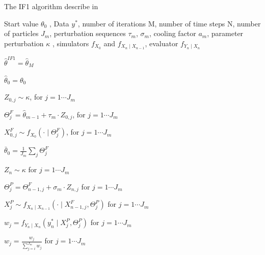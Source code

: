 \documentclass[twoside,openright]{report}
\begin{document}
\begin{algorithm}
  \caption{The IF1 algorithm describe in \cite{ionides2011iterated}}\label{alg:IF1_pseudo_code}
  \begin{algorithmic}
    
    \Require Start value $\theta_0$ , Data $y^{*}$, number of iterations M, number of time steps N,  number of particles $J_m$, perturbation sequences $\tau_m$, $\sigma_m$, cooling factor $a_m$, parameter perturbation $\kappa$ , simulators $f_{X_0}$ and $f_{X_n \mid X_{n-1}}$, evaluator $f_{Y_n \mid X_n}$
    
    \Ensure $\hat{\theta}^{IF1} = \hat{\theta}_M$ 
    
    \State $\hat{\theta}_0 = \theta_0$
    
        
        \State $Z_{0,j} \sim \kappa$, for $j = 1 \cdots J_m$  
        
        \State $\Theta^{F}_j = \hat{\theta}_{m-1} + \tau_{m} \cdot Z_{0,j}$, for $j = 1 \cdots J_m$  
        
        \State $X^{F}_{0,j} \sim f_{X_0}( \cdot \mid \Theta^{F}_j)$, for $j = 1 \cdots J_m$  
        
        \State $\bar{\theta}_0 = \frac{1}{J_m} \sum_{j} \Theta^F_j$  
        
            
            \State $Z_n \sim \kappa$ for $j = 1 \cdots J_m$ 
            
            \State $\Theta^{P}_j = \Theta^{F}_{n-1,j} + \sigma_m \cdot Z_{n,j}$ for $j = 1 \cdots J_m$ 
            
            \State $X^{P}_{j} \sim f_{X_n \mid X_{n-1}}(\cdot \mid  X^F_{n-1,j}, \Theta^{P}_j )$ for $j = 1 \cdots J_m$ 
            
            \State $w_j = f_{Y_n \mid X_n}(y^{*}_n \mid X^{P}_{j}, \Theta^{P}_j )$ for $j = 1 \cdots J_m$ 
            
            \State $w_j = \frac{ w_j }{  \sum_{j = i}^{J_m} w_j }$ for $j = 1 \cdots J_m$  
            

\end{algorithmic}
\end{algorithm}
\end{document}
